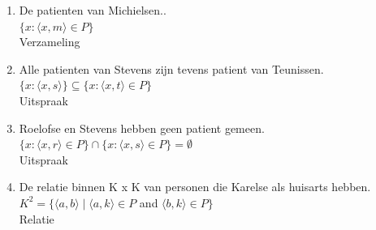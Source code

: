 \documentclass[11pt]{article}
\begin{document}
\begin{enumerate}
\item De patienten van Michielsen..
\\
$ \{x : \langle x, m \rangle \in P \} $
\\
Verzameling
\item Alle patienten van Stevens zijn tevens patient van Teunissen.
\\
$ \{x : \langle x, s \rangle \} \subseteq \{x : \langle x, t \rangle \in P \} $
\\
Uitspraak
\item Roelofse en Stevens hebben geen patient gemeen.
\\
$ \{x : \langle x, r \rangle \in P \} \cap \{x : \langle x, s \rangle \in P \} = \emptyset $
\\
Uitspraak
\item De relatie binnen K x K van personen die Karelse als huisarts hebben.
\\
$ K^2 = \{ \langle a, b \rangle \mid \langle a, k \rangle \in P $
  and $ \langle b, k \rangle \in P \}$
\\
Relatie
\end{enumerate}
\end{document}
